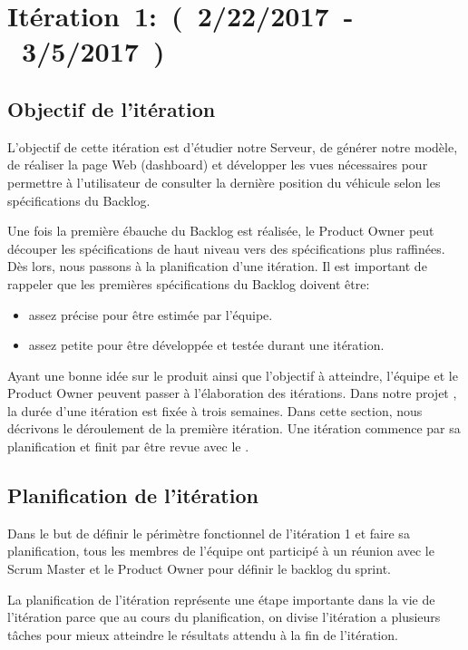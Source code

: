 \section{Itération~1:~(~2/22/2017~-~3/5/2017~)}

\subsection{Objectif de l'itération}

L'objectif de cette itération est d'étudier notre Serveur, de générer notre
modèle, de réaliser la page Web (dashboard) et développer les vues nécessaires
pour permettre à l'utilisateur de consulter la dernière position du véhicule
selon les spécifications du Backlog.

Une fois la première ébauche du Backlog est réalisée, le Product Owner peut
découper les spécifications de haut niveau vers des spécifications plus
raffinées. Dès lors, nous passons à la planification d'une itération. Il est
important de rappeler que les premières spécifications du Backlog doivent être:

\begin{itemize}
    \item assez précise pour être estimée par l'équipe.
    \item assez petite pour être développée et testée durant une itération.
\end{itemize}

Ayant une bonne idée sur le produit ainsi que l'objectif à atteindre, l'équipe
et le Product Owner peuvent passer à l'élaboration des itérations. Dans notre
projet , la durée d'une itération est fixée à
trois semaines. Dans cette section, nous décrivons le déroulement de la
première itération. Une itération commence par sa planification et finit par
être revue avec le .

\subsection{Planification de l'itération}

Dans le but de définir le périmètre fonctionnel de l'itération 1 et faire sa
planification, tous les membres de l'équipe ont participé à un réunion avec le
Scrum Master et le Product Owner pour définir le backlog du sprint.

La planification de l'itération représente une étape importante dans la vie de
l'itération parce que au cours du planification, on divise l'itération a
plusieurs tâches pour mieux atteindre le résultats attendu à la fin de
l'itération.


